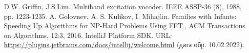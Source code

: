 \documentclass[a4paper,article,14pt]{extarticle}
\begin{document}


\tableofcontents
\pagebreak

















\begin{thebibliography}{1}
 D.W. Griffin, J.S.Lim. Multiband excitation vocoder. IEEE ASSP-36 (8), 1988, pp. 1223-1235.
 A. Golovnev, A. S. Kulikov, I. Mihajlin. Families with Infants: Speeding Up Algorithms for NP-Hard Problems Using FFT., ACM Transactions on Algorithms, 12:3, 2016.
 IntelliJ Platform SDK﻿. URL: \url{https://plugins.jetbrains.com/docs/intellij/welcome.html} (дата обр. 10.02.2022).
\end{thebibliography}
\end{document}
